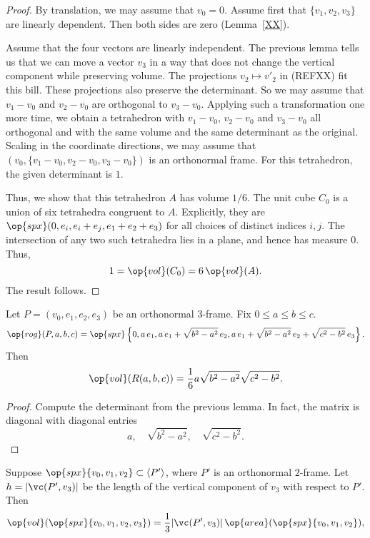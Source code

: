 \begin{proof} By
translation, we may assume that $v_0=0$. 
Assume first that $\{v_1,v_2,v_3\}$ are linearly dependent. Then
both sides are zero (Lemma~\ref{XX}).

Assume that the four vectors are linearly independent.   The previous lemma tells
us that we can move a vector $v_3$ in a way that does not change the
vertical component while preserving volume. The projections
$v_2\mapsto v'_2$ in (REFXX) fit this bill.  These projections also
preserve the determinant. So we may assume that $v_1-v_0$ and $v_2-v_0$ are
orthogonal to $v_3-v_0$. Applying such a transformation one more
time, we obtain a tetrahedron with $v_1-v_0$, $v_2-v_0$ and
$v_3-v_0$ all orthogonal and with the same volume and the same determinant
as the original. Scaling in the coordinate directions, we may assume
that $(v_0,\{v_1-v_0,v_2-v_0,v_3-v_0\})$ is an orthonormal frame.
For this tetrahedron,
the given determinant is $1$.

Thus, we show that this tetrahedron $A$ has volume $1/6$.  The unit
cube $C_0$ is a union of six tetrahedra congruent to $A$.
Explicitly, they are $\op{spx}(0,e_i,e_i+e_j,e_1+e_2+e_3)$ for all
choices of distinct indices $i,j$. The intersection of any two such
tetrahedra lies in a plane, and hence has measure $0$.  Thus,
    $$1 = \op{vol}(C_0) = 6\,\op{vol}(A).$$
The result follows.
\end{proof}

\begin{lemma}  Let
$P=(v_0,e_1,e_2,e_3)$ be an orthonormal $3$-frame.   Fix $0\le a\le
b\le c$.
   $$\op{rog}(P,a,b,c) = \op{spx}\left\{0,a\, e_1,a\, e_1 + \sqrt{b^2-a^2}\, e_2,
     a\, e_1 + \sqrt{b^2-a^2}\, e_2 + \sqrt{c^2-b^2}\, e_3\right\}.$$
Then
    $$\op{vol}(R(a,b,c)) = \frac{1}{6} a
    \sqrt{b^2-a^2}\sqrt{c^2-b^2}.$$
\end{lemma}

\begin{proof}
Compute the determinant from the previous
lemma.  In fact, the matrix is diagonal with diagonal entries
	$$a,\quad \sqrt{b^2-a^2},\quad
	\sqrt{c^2-b^2}.$$
\end{proof}



\begin{lemma} Suppose
$\op{spx}\{v_0,v_1,v_2\}\subset \aspan{P'}$, where $P'$ is an
orthonormal $2$-frame. Let $h = |\vc(P',v_3)|$ be the length of
the vertical component of $v_3$ with respect to $P'$.  Then
    $$\op{vol}(\op{spx}\{v_0,v_1,v_2,v_3\}) = \frac{1}{3} |\vc(P',v_3)|
     \,
    \op{area}(\op{spx}\{v_0,v_1,v_2\}),
    $$

\end{lemma}

